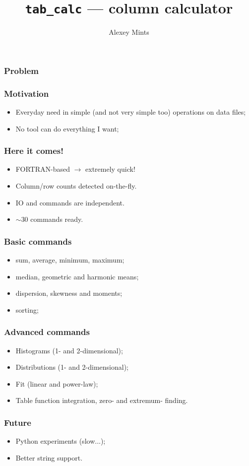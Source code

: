 \documentclass[14pt]{beamer}
\author{Alexey Mints}
\title{\texttt{tab\_calc} --- column calculator}
\begin{document}
\maketitle

\begin{frame}
 \frametitle{Problem}
 \begin{tiny} \end{tiny}
\end{frame}

\begin{frame}
 \frametitle{Motivation}
\begin{itemize}
 \item Everyday need in simple (and not very simple too) operations on data files;
 \item No tool can do everything I want;
\end{itemize}
\end{frame}

\begin{frame}
 \frametitle{Here it comes!}
\begin{itemize}
 \item FORTRAN-based $\xrightarrow{}$ extremely quick!
 \item Column/row counts detected on-the-fly.
 \item IO and commands are independent.
 \item $\sim30$ commands ready.
\end{itemize}

\end{frame}

\begin{frame}
 \frametitle{Basic commands}
\begin{itemize}
 \item sum, average, minimum, maximum;
 \item median, geometric and harmonic means;
 \item dispersion, skewness and moments;
 \item sorting;
\end{itemize}
\end{frame}

\begin{frame}
 \frametitle{Advanced commands}
\begin{itemize}
 \item Histograms (1- and 2-dimensional);
 \item Distributions (1- and 2-dimensional);
 \item Fit (linear and power-law);
 \item Table function integration, zero- and extremum- finding.
\end{itemize}
\end{frame}

\begin{frame}
 \frametitle{Future}
\begin{itemize}
 \item Python experiments (slow...);
 \item Better string support.
\end{itemize}

\end{frame}
\end{document}
